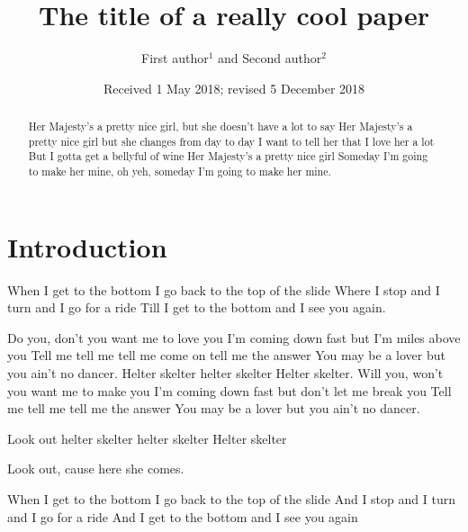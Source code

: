 \documentclass[vruler,JCS]{COB}
\begin{document}

\title{The title of a really cool paper}

\author{First author$^{1}$ and Second author$^{2}$}

\address{
}


\date{Received 1 May 2018; revised 5 December 2018}

\maketitle

\begin{abstract}
Her Majesty's a pretty nice girl,
but she doesn't have a lot to say
Her Majesty's a pretty nice girl
but she changes from day to day
I want to tell her that I love her a lot
But I gotta get a bellyful of wine
Her Majesty’s a pretty nice girl
Someday I'm going to make her mine, oh yeh,
someday I'm going to make her mine.
\end{abstract}


\section{Introduction}\label{s:introduction}

When I get to the bottom I go back to the top of the slide
Where I stop and I turn and I go for a ride
Till I get to the bottom and I see you again.

Do you, don't you want me to love you
I'm coming down fast but I’m miles above you
Tell me tell me tell me come on tell me the answer
You may be a lover but you ain't no dancer.
Helter skelter helter skelter
Helter skelter.
Will you, won't you want me to make you
I'm coming down fast but don't let me break you
Tell me tell me tell me the answer
You may be a lover but you ain't no dancer.

Look out helter skelter helter skelter
Helter skelter 

Look out, cause here she comes.

When I get to the bottom I go back to the top of the slide
And I stop and I turn and I go for a ride
And I get to the bottom and I see you again
\end{document}
